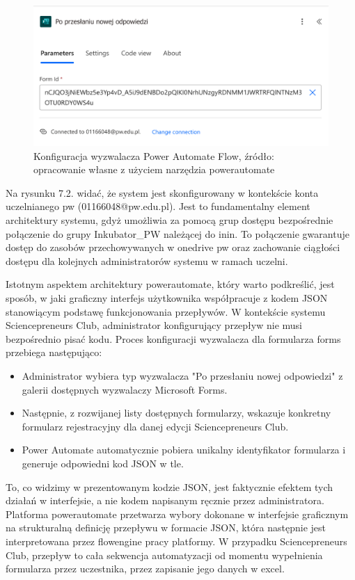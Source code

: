 \begin{figure}[!hb]
	\centering \includegraphics[width=0.7\linewidth]{rysunki/KonfiguracjaPowerAutomate.png}
	\caption{Konfiguracja wyzwalacza Power Automate Flow, źródło: opracowanie własne z użyciem narzędzia \gls{powerautomate}}
\end{figure}

Na rysunku 7.2. widać, że system jest skonfigurowany w kontekście konta uczelnianego \gls{pw} (01166048@pw.edu.pl). Jest to fundamentalny element architektury systemu, gdyż umożliwia za pomocą grup dostępu bezpośrednie połączenie do grupy Inkubator\_PW należącej do \gls{inin}. To połączenie gwarantuje dostęp do zasobów przechowywanych w \gls{onedrive} \gls{pw} oraz zachowanie ciągłości dostępu dla kolejnych administratorów systemu w ramach uczelni.

Istotnym aspektem architektury \gls{powerautomate}, który warto podkreślić, jest sposób, w jaki graficzny interfejs użytkownika współpracuje z kodem JSON stanowiącym podstawę funkcjonowania przepływów. W kontekście systemu Sciencepreneurs Club, administrator konfigurujący przepływ nie musi bezpośrednio pisać kodu. Proces konfiguracji wyzwalacza dla formularza \gls{forms} przebiega następująco:

\begin{itemize}
    \item Administrator wybiera typ wyzwalacza "Po przesłaniu nowej odpowiedzi" z galerii dostępnych wyzwalaczy Microsoft Forms.
    \item Następnie, z rozwijanej listy dostępnych formularzy, wskazuje konkretny formularz rejestracyjny dla danej edycji Sciencepreneurs Club.
    \item Power Automate automatycznie pobiera unikalny identyfikator formularza i generuje odpowiedni kod JSON w tle.
\end{itemize}

To, co widzimy w prezentowanym kodzie JSON, jest faktycznie efektem tych działań w interfejsie, a nie kodem napisanym ręcznie przez administratora. Platforma \gls{powerautomate} przetwarza wybory dokonane w interfejsie graficznym na strukturalną definicję przepływu w formacie JSON, która następnie jest interpretowana przez \gls{flowengine} pracy platformy.\cite{microsoft_power_automate_2025} W przypadku Sciencepreneurs Club, przepływ to cała sekwencja automatyzacji od momentu wypełnienia formularza przez uczestnika, przez zapisanie jego danych w \gls{excel}.

